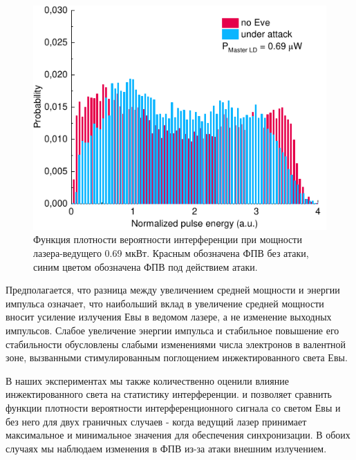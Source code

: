 \begin{figure}
	\includegraphics[width=\linewidth]{images/hist_attack_01.pdf}
	\caption{Функция плотности вероятности интерференции при мощности лазера-ведущего 0.69 мкВт. Красным обозначена ФПВ без атаки, синим цветом обозначена ФПВ под действием атаки.}
	\label{fig:histogram_min}
\end{figure}


Предполагается, что разница между увеличением средней мощности и энергии импульса означает, что наибольший вклад в увеличение средней мощности вносит усиление излучения Евы в ведомом лазере, а не изменение выходных импульсов. Слабое увеличение энергии импульса и стабильное повышение его стабильности обусловлены слабыми изменениями числа электронов в валентной зоне, вызванными стимулированным поглощением инжектированного света Евы. 

В наших экспериментах мы также количественно оценили влияние инжектированного света на статистику интерференции.  и  позволяет сравнить функции плотности вероятности интерференционного сигнала со светом Евы и без него для двух граничных случаев - когда ведущий лазер принимает максимальное и минимальное значения для обеспечения синхронизации. В обоих случаях мы наблюдаем изменения в ФПВ из-за атаки внешним излучением.

